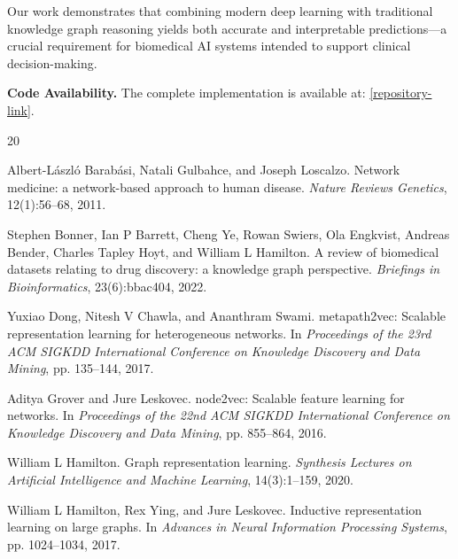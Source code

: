 \documentclass[11pt]{article}
\begin{document}
Our work demonstrates that combining modern deep learning with traditional knowledge graph reasoning yields both accurate and interpretable predictions---a crucial requirement for biomedical AI systems intended to support clinical decision-making.

\textbf{Code Availability.} The complete implementation is available at: \url{[repository-link]}.




\begin{thebibliography}{20}

Albert-L\'aszl\'o Barab\'asi, Natali Gulbahce, and Joseph Loscalzo.
\newblock Network medicine: a network-based approach to human disease.
\newblock \emph{Nature Reviews Genetics}, 12(1):56--68, 2011.

Stephen Bonner, Ian P Barrett, Cheng Ye, Rowan Swiers, Ola Engkvist, Andreas Bender, Charles Tapley Hoyt, and William L Hamilton.
\newblock A review of biomedical datasets relating to drug discovery: a knowledge graph perspective.
\newblock \emph{Briefings in Bioinformatics}, 23(6):bbac404, 2022.

Yuxiao Dong, Nitesh V Chawla, and Ananthram Swami.
\newblock metapath2vec: Scalable representation learning for heterogeneous networks.
\newblock In \emph{Proceedings of the 23rd ACM SIGKDD International Conference on Knowledge Discovery and Data Mining}, pp. 135--144, 2017.

Aditya Grover and Jure Leskovec.
\newblock node2vec: Scalable feature learning for networks.
\newblock In \emph{Proceedings of the 22nd ACM SIGKDD International Conference on Knowledge Discovery and Data Mining}, pp. 855--864, 2016.

William L Hamilton.
\newblock Graph representation learning.
\newblock \emph{Synthesis Lectures on Artificial Intelligence and Machine Learning}, 14(3):1--159, 2020.

William L Hamilton, Rex Ying, and Jure Leskovec.
\newblock Inductive representation learning on large graphs.
\newblock In \emph{Advances in Neural Information Processing Systems}, pp. 1024--1034, 2017.


\end{thebibliography}
\end{document}
